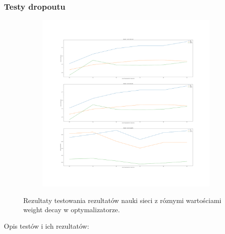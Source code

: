 \documentclass[12pt]{article}
\begin{document}
\subsubsection{Testy dropoutu}
\begin{figure}[H]
	\centering
	\begin{subfigure}[b]{1\linewidth}
		\includegraphics[width=\linewidth]{Comparision_dropout.png}
	\end{subfigure}
	\label{fig:decay}
	\caption{Rezultaty testowania rezultatów nauki sieci z róznymi wartościami weight decay w optymalizatorze.}
\end{figure}
Opis testów i ich rezultatów:
\end{document}
